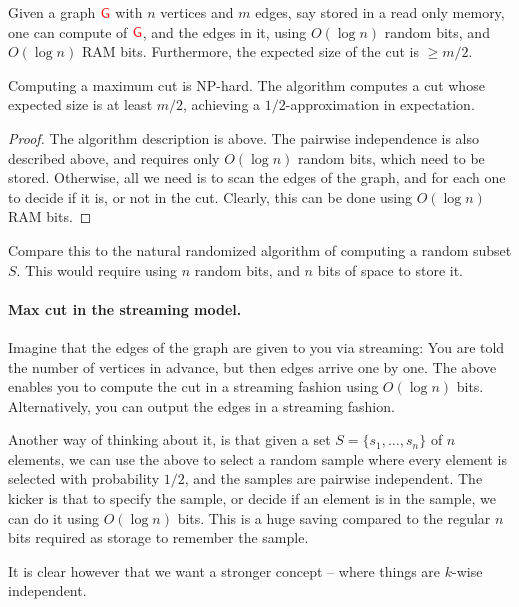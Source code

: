 \begin{lemma}
    Given a graph ${\textcolor{red}{\mathsf{G}}}$ with $n$ vertices and $m$ edges, say stored
    in a read only memory, one can compute  of ${\textcolor{red}{\mathsf{G}}}$, and
    the edges in it, using $O( \log n)$ random bits, and $O(\log n)$
    RAM bits. Furthermore, the expected size of the cut is $\geq m/2$.
\end{lemma}

Computing a maximum cut is NP-hard. The algorithm computes a cut whose
expected size is at least $m/2$, achieving a $1/2$-approximation in
expectation.

\begin{proof}
    The algorithm description is above. The pairwise independence is
    also described above, and requires only $O( \log n)$ random bits,
    which need to be stored. Otherwise, all we need is to scan the
    edges of the graph, and for each one to decide if it is, or not in
    the cut. Clearly, this can be done using $O( \log n)$ RAM bits.
\end{proof}

Compare this to the natural randomized algorithm of computing a random
subset $S$. This would require using $n$ random bits, and $n$ bits of
space to store it.


\paragraph*{Max cut in the streaming model.}

Imagine that the edges of the graph are given to you via streaming:
You are told the number of vertices in advance, but then edges arrive
one by one. The above enables you to compute the cut in a streaming
fashion using $O( \log n)$ bits. Alternatively, you can output the
edges in a streaming fashion.

Another way of thinking about it, is that given a set
$S=\{s_1, \ldots, s_n\}$ of $n$ elements, we can use the above to
select a random sample where every element is selected with
probability $1/2$, and the samples are pairwise independent. The kicker
is that to specify the sample, or decide if an element is in the
sample, we can do it using $O( \log n)$ bits. This is a huge saving
compared to the regular $n$ bits required as storage to remember the
sample.

It is clear however that we want a stronger concept -- where things
are $k$-wise independent.




